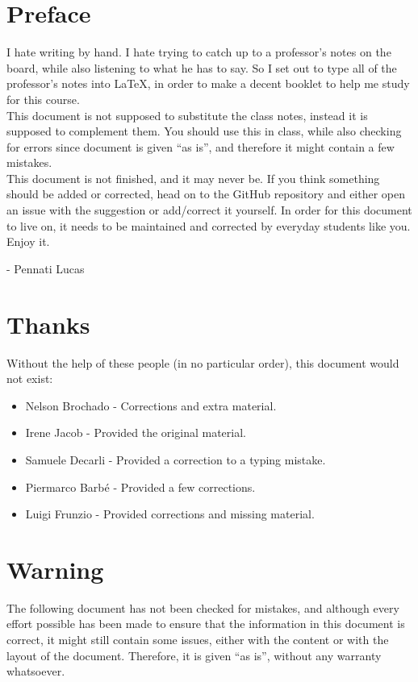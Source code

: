 \section*{Preface}
I hate writing by hand. I hate trying to catch up to a professor's notes on the board, while also listening to what he has to say. So I set out to type all of the professor's notes into \LaTeX, in order to make a decent booklet to help me study for this course.\\

This document is not supposed to substitute the class notes, instead it is supposed to complement them. You should use this in class, while also checking for errors since document is given ``as is'', and therefore it might contain a few mistakes.\\

This document is not finished, and it may never be. If you think something should be added or corrected, head on to the GitHub repository and either open an issue with the suggestion or add/correct it yourself. In order for this document to live on, it needs to be maintained and corrected by everyday students like you.\\

\noindent Enjoy it.
\begin{flushright}
- Pennati Lucas
\end{flushright}
\section*{Thanks}
Without the help of these people (in no particular order), this document would not exist:
\begin{itemize}
\item Nelson Brochado - Corrections and extra material.
\item Irene Jacob - Provided the original material.
\item Samuele Decarli - Provided a correction to a typing mistake.
\item Piermarco Barb\'{e} - Provided a few corrections.
\item Luigi Frunzio - Provided corrections and missing material.
\end{itemize}
\section*{Warning}
The following document has not been checked for mistakes, and although every effort possible has been made to ensure that the information in this document is correct, it might still contain some issues, either with the content or with the layout of the document. Therefore, it is given ``as is'', without any warranty whatsoever. \\

